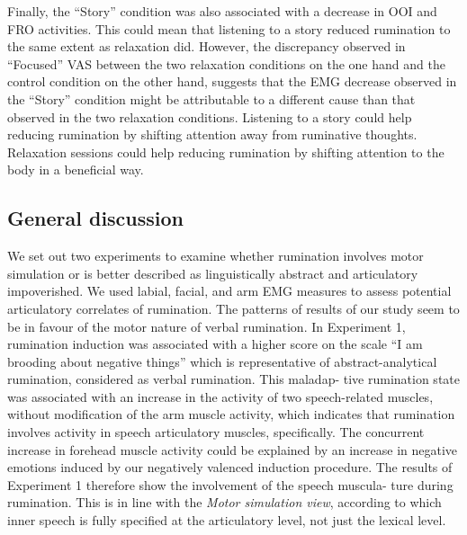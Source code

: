\documentclass[a4paper,12pt,twoside,openright,oldfontcommands]{memoir}
\begin{document}
Finally, the ``Story'' condition was also associated with a decrease in
OOI and FRO activities. This could mean that listening to a story
reduced rumination to the same extent as relaxation did. However, the
discrepancy observed in ``Focused'' VAS between the two relaxation
conditions on the one hand and the control condition on the other hand,
suggests that the EMG decrease observed in the ``Story'' condition might
be attributable to a different cause than that observed in the two
relaxation conditions. Listening to a story could help reducing
rumination by shifting attention away from ruminative thoughts.
Relaxation sessions could help reducing rumination by shifting attention
to the body in a beneficial way.

\subsection{General discussion}\label{general-discussion}

We set out two experiments to examine whether rumination involves motor
simulation or is better described as linguistically abstract and
articulatory impoverished. We used labial, facial, and arm EMG measures
to assess potential articulatory correlates of rumination. The patterns
of results of our study seem to be in favour of the motor nature of
verbal rumination. In Experiment 1, rumination induction was associated
with a higher score on the scale ``I am brooding about negative things''
which is representative of abstract-analytical rumination, considered as
verbal rumination. This maladap- tive rumination state was associated
with an increase in the activity of two speech-related muscles, without
modification of the arm muscle activity, which indicates that rumination
involves activity in speech articulatory muscles, specifically. The
concurrent increase in forehead muscle activity could be explained by an
increase in negative emotions induced by our negatively valenced
induction procedure. The results of Experiment 1 therefore show the
involvement of the speech muscula- ture during rumination. This is in
line with the \emph{Motor simulation view}, according to which inner
speech is fully specified at the articulatory level, not just the
lexical level.
\end{document}
